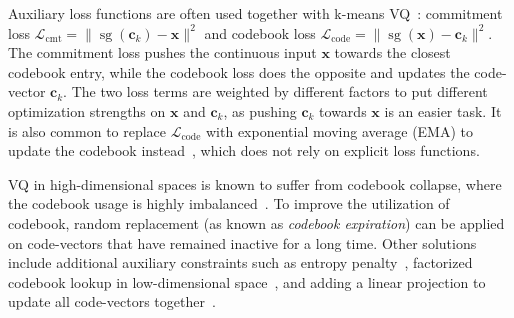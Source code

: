 Auxiliary loss functions are often used together with k-means VQ~\cite{VQVAE}: commitment loss $\mathcal L_{\text{cmt}}=\|\operatorname{sg}(\bm c_k)-\bm x\|^2$ and codebook loss $\mathcal L_{\text{code}}=\|\operatorname{sg}(\bm x)-\bm c_k\|^2$.
The commitment loss pushes the continuous input $\bm x$ towards the closest codebook entry, while the codebook loss does the opposite and updates the code-vector $\bm c_k$.
The two loss terms are weighted by different factors to put different optimization strengths on $\bm x$ and $\bm c_k$, as pushing $\bm c_k$ towards $\bm x$ is an easier task.
It is also common to replace $\mathcal L_{\text{code}}$ with exponential moving average (EMA) to update the codebook instead~\cite{razavi2019generating}, which does not rely on explicit loss functions.

VQ in high-dimensional spaces is known to suffer from codebook collapse,  where the codebook usage is highly imbalanced~\cite{lancucki2020robust,dhariwal2020jukebox}.
To improve the utilization of codebook, random replacement (as known as \textit{codebook expiration}) can be applied~\cite{dhariwal2020jukebox} on code-vectors that have remained inactive for a long time. 
Other solutions include additional auxiliary constraints such as entropy penalty~\cite{chang2022maskgit,yu2024language}, factorized codebook lookup in low-dimensional space~\cite{yu2022vectorquantized}, and adding a linear projection to update all code-vectors together~\cite{zhu2024addressing}. 

